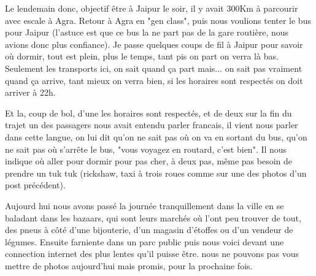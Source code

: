 \begin{multicols}{2}
Le lendemain donc, objectif être à Jaipur le soir, il y avait 300Km à parcourir avec escale à Agra. Retour à Agra en "gen class", puis nous voulions tenter le bus pour Jaipur (l'astuce est que ce bus la ne part pas de la gare routière, nous avions donc plus confiance). Je passe quelques coups de fil à Jaipur pour savoir où dormir, tout est plein, plus le temps, tant pis on part on verra là bas. Seulement les transports ici, on sait quand ça part mais... on sait pas vraiment quand ça arrive, tant mieux on verra bien, si les horaires sont respectés on doit arriver à 22h.

Et la, coup de bol, d'une les horaires sont respectés, et de deux sur la fin du trajet un des passagers nous avait entendu parler francais, il vient nous parler dans cette langue, on lui dit qu'on ne sait pas où on va en sortant du bus, qu'on ne sait pas où s'arrête le bus, "vous voyagez en routard, c'est bien". Il nous indique où aller pour dormir pour pas cher, à deux pas, même pas besoin de prendre un tuk tuk (rickshaw, taxi à trois roues comme sur une des photos d'un post précédent).

Aujourd hui nous avons passé la journée tranquillement dans la ville en se baladant dans les bazaars, qui sont leurs marchés où l'ont peu trouver de tout, des pneus à côté d'une bijouterie, d'un magasin d'étoffes ou d'un vendeur de légumes. Ensuite farniente dans un parc public puis nous voici devant une connection internet des plus lentes qu'il puisse être. nous ne pouvons pas vous mettre de photos aujourd'hui mais promis, pour la prochaine fois.

\end{multicols}


